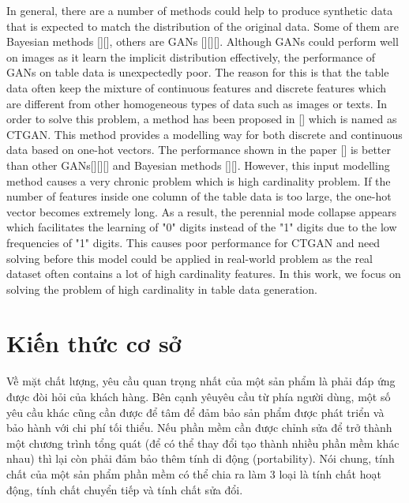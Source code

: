 \documentclass{article}
\begin{document}
In general, there are a number of methods could help to produce synthetic data that is expected to match the distribution of the original data. Some of them are Bayesian methods [][], others are \ac{GANs} [][][]. Although \ac{GANs} could perform well on images as it learn the implicit distribution effectively, the performance of \ac{GANs} on table data is unexpectedly poor. The reason for this is that the table data often keep the mixture of continuous features and discrete features which are different from other homogeneous types of data such as images or texts. In order to solve this problem, a method has been proposed in [] which is named as \ac{CTGAN}. This method provides a modelling way for both discrete and continuous data based on one-hot vectors. The performance shown in the paper [] is better than other \ac{GANs}[][][] and Bayesian methods [][]. However, this input modelling method causes a very chronic problem which is high cardinality problem. If the number of features inside one column of the table data is too large, the one-hot vector becomes extremely long. As a result, the perennial mode collapse appears which facilitates the learning of "0" digits instead of the "1" digits due to the low frequencies of "1" digits. This causes poor performance for \ac{CTGAN} and need solving before this model could be applied in real-world problem as the real dataset often contains a lot of high cardinality features. In this work, we focus on solving the problem of high cardinality in table data generation. 

\section{Kiến thức cơ sở}\label{ktcs}

Về mặt chất lượng, yêu cầu quan trọng nhất của một sản phẩm là phải đáp ứng được đòi hỏi của khách hàng. Bên cạnh yêuyêu cầu từ phía người dùng, một số yêu cầu khác cũng cần được để tâm để đảm bảo sản phẩm được phát triển và bảo hành với chi phí tối thiểu. Nếu phần mềm cần được chỉnh sửa để trở thành một chương trình tổng quát (để có thể thay đổi tạo thành nhiều phần mềm khác nhau) thì lại còn phải đảm bảo thêm tính di động (portability). Nói chung, tính chất của một sản phẩm phần mềm có thể chia ra làm 3 loại là tính chất hoạt động, tính chất chuyển tiếp và tính chất sửa đổi.
\end{document}
